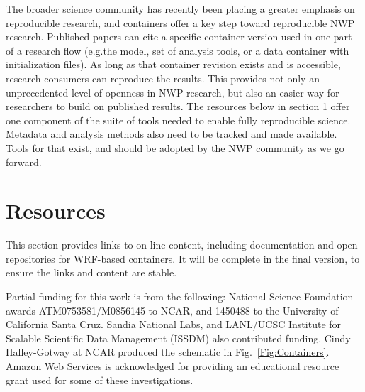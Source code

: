 \documentclass[final]{ametsoc}
\begin{document}
The broader science community has recently been placing a greater emphasis on reproducible research, and containers offer a key step toward reproducible NWP research. Published papers can cite a specific container version used in one part of a research flow (e.g.\@ the model, set of analysis tools, or a data container with initialization files). As long as that container revision exists and is accessible, research consumers can reproduce the results. This provides not only an unprecedented level of openness in NWP research, but also an easier way for researchers to build on published results. The resources below in section \ref{sec:resources} offer one component of the suite of tools needed to enable fully reproducible science. Metadata and analysis methods also need to be tracked and made available. Tools for that exist, and should be adopted by the NWP community as we go forward.



\section{Resources}\label{sec:resources}

This section provides links to on-line content, including documentation and open repositories for WRF-based containers. It will be complete in the final version, to ensure the links and content are stable.

%
\acknowledgments
Partial funding for this work is from the following: National Science Foundation awards ATM0753581/M0856145 to NCAR, and 1450488 to the University of California Santa Cruz. Sandia National Labs, and LANL/UCSC Institute for Scalable Scientific Data Management (ISSDM) also contributed funding. Cindy Halley-Gotway at NCAR produced the schematic in Fig.~\ref{Fig:Containers}. Amazon Web Services is acknowledged for providing an educational resource grant used for some of these investigations.

%


\end{document}
